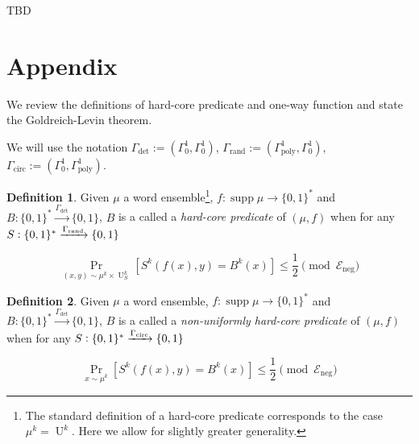 \documentclass{article}
\numberwithin{equation}{section}
\theoremstyle{definition}
\newtheorem{definition}{Definition}[section]
\theoremstyle{plain}
\newcommand{\Bool}{\{0,1\}}
\newcommand{\Words}{{\Bool^*}}
\DeclareMathOperator{\Supp}{supp}
\DeclareMathOperator{\Prb}{Pr}
\DeclareMathOperator{\Un}{U}
\newcommand{\Fall}{\mathcal{E}}
\begin{document}
TBD

\appendix

\section{Appendix}

We review the definitions of hard-core predicate and one-way function and state the Goldreich-Levin theorem.

We will use the notation $\Gamma_{\text{det}}:=(\Gamma_0^1,\Gamma_0^1)$, $\Gamma_{\text{rand}}:=(\Gamma_{\text{poly}}^1,\Gamma_0^1)$, ${\Gamma_{\text{circ}}:=(\Gamma_0^1,\Gamma_{\text{poly}}^1)}$.

\begin{samepage}
\begin{definition}

Given $\mu$ a word ensemble\footnote{The standard definition of a hard-core predicate corresponds to the case $\mu^k=\Un^k$. Here we allow for slightly greater generality.}, $f: \Supp \mu \rightarrow \Words$ and ${B: \Words \xrightarrow{\Gamma_{\text{det}}} \Bool}$, $B$ is a called a \emph{hard-core predicate} of $(\mu,f)$ when for any $S: \Words \xrightarrow{\Gamma_{\textnormal{rand}}} \Bool$

\begin{equation}
\Prb_{(x,y) \sim \mu^k \times \Un_S^k}[S^k(f(x),y)=B^k(x)] \leq \frac{1}{2} \pmod {\Fall_{\text{neg}}}
\end{equation}

\end{definition}
\end{samepage}

\begin{samepage}
\begin{definition}

Given $\mu$ a word ensemble, $f: \Supp \mu \rightarrow \Words$ and ${B: \Words \xrightarrow{\Gamma_{\text{det}}} \Bool}$, $B$ is a called a \emph{non-uniformly hard-core predicate} of $(\mu,f)$ when for any ${S: \Words \xrightarrow{\Gamma_{\textnormal{circ}}} \Bool}$ 

\begin{equation}
\Prb_{x \sim \mu^k}[S^k(f(x),y)=B^k(x)] \leq \frac{1}{2} \pmod {\Fall_{\text{neg}}}
\end{equation}

\end{definition}
\end{samepage}
\end{document}
